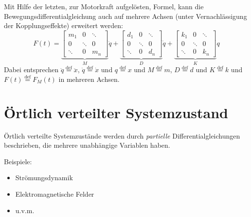             Mit Hilfe der letzten, zur Motorkraft aufgelösten, Formel, kann die Bewegungsdifferentialgleichung auch auf mehrere Achsen (unter Vernachlässigung der Kopplungseffekte) erweitert werden:
            \begin{equation*}
	            F (t) =
	            \underbrace{
		            \begin{bmatrix}
			            m _ 1 & 0 & \ddots \\
			            0 & \ddots & 0 \\
			            \ddots & 0 & m _ n
		            \end{bmatrix}
		        } _ { M }
		        \ddot{q} +
			    \underbrace{
			        \begin{bmatrix}
				        d _ 1 & 0 & \ddots \\
				        0 & \ddots & 0 \\
				        \ddots & 0 & d _ n
			        \end{bmatrix}
			    } _ { D }
			    \dot{q} +
				\underbrace{
				    \begin{bmatrix}
					    k _ 1 & 0 & \ddots \\
					    0 & \ddots & 0 \\
					    \ddots & 0 & k _ n
				    \end{bmatrix}
				} _ { K }
				q
            \end{equation*}
            Dabei entsprechen \( \ddot{q} \overset{\text{def}}{=} \ddot{x} \), \( \dot{q} \overset{\text{def}}{=} \dot{x} \) und \( q \overset{\text{def}}{=} x \) und \( M \overset{\text{def}}{=} m \), \( D \overset{\text{def}}{=} d \) und \( K \overset{\text{def}}{=} k \) und \( F(t) \overset{\text{def}}{=} F _ M (t) \) in mehreren Achsen.

    \section{Örtlich verteilter Systemzustand} %
        Örtlich verteilte Systemzustände werden durch \textit{partielle} Differentialgleichungen beschrieben, die mehrere unabhängige Variablen haben.
        
        Beispiele:
        \begin{itemize}
        	\item Strömungsdynamik
        	\item Elektromagnetische Felder
        	\item u.v.m.
        \end{itemize}
        
